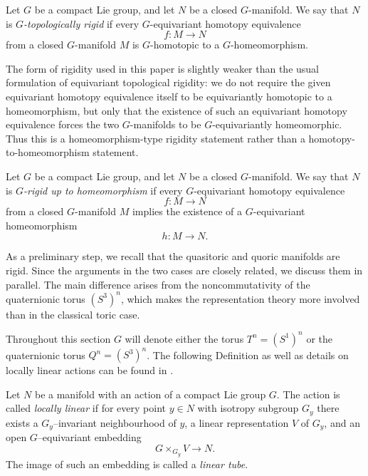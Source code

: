 \documentclass[11pt,a4paper]{article}
\numberwithin{equation}{section}
\theoremstyle{named}
\begin{document}
\begin{definition}
\label{def:eq_rigidity}
Let \(G\) be a compact Lie group, and let \(N\) be a closed \(G\)-manifold. We say that \(N\) is \emph{\(G\)-topologically rigid} if every \(G\)-equivariant homotopy equivalence
\[
    f:M\longrightarrow N
\]
from a closed \(G\)-manifold \(M\) is \(G\)-homotopic to a \(G\)-homeomorphism.
\end{definition}

The form of rigidity used in this paper is slightly weaker than the usual formulation of equivariant topological rigidity: we do not require the given equivariant homotopy equivalence itself to be equivariantly homotopic to a homeomorphism, but only that the existence of such an equivariant homotopy equivalence forces the two \(G\)-manifolds to be \(G\)-equivariantly homeomorphic. Thus this is a homeomorphism-type rigidity statement rather than a homotopy-to-homeomorphism statement.

\begin{definition}
\label{def:eq_rigidity_weak}
Let \(G\) be a compact Lie group, and let \(N\) be a closed \(G\)-manifold. We say that \(N\) is \emph{\(G\)-rigid up to homeomorphism} if every \(G\)-equivariant homotopy equivalence
\[
    f:M\longrightarrow N
\]
from a closed \(G\)-manifold \(M\) implies the existence of a \(G\)-equivariant homeomorphism
\[
    h:M\longrightarrow N.
\]
\end{definition}

As a preliminary step, we recall that the quasitoric and quoric manifolds are rigid. Since the arguments in the two cases are closely related, we discuss them in parallel. The main difference arises from the noncommutativity of the quaternionic torus $(S^3)^n$, which makes the representation theory more involved than in the classical toric case.

\medskip

Throughout this section $G$ will denote either the torus $T^n=(S^1)^n$ or the quaternionic torus $Q^n=(S^3)^n$. The following Definition as well as details on locally linear actions can be found in \cite[p.171]{bredon}.

\begin{definition}
Let $N$ be a manifold with an action of a compact Lie group $G$. The action is called \emph{locally linear} if for every point $y\in N$ with isotropy subgroup $G_y$ there exists a $G_y$--invariant neighbourhood of $y$, a linear representation $V$ of $G_y$, and an open $G$--equivariant embedding
\[
G\times_{G_y} V \longrightarrow N .
\]
The image of such an embedding is called a \emph{linear tube}.
\end{definition}
\end{document}
